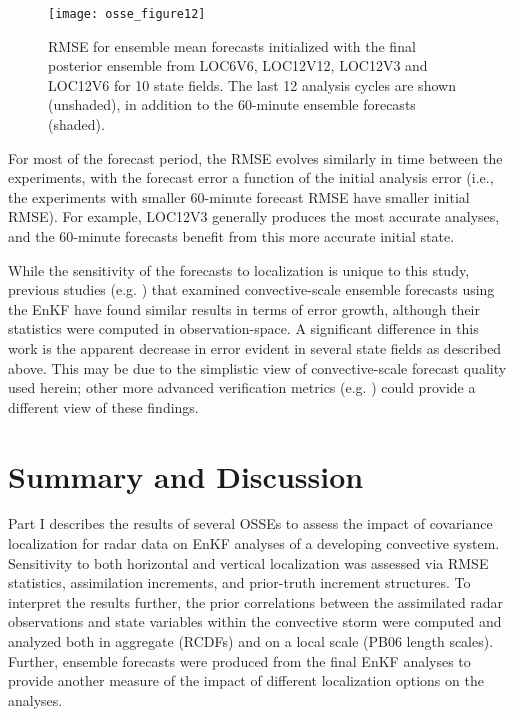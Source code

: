 \begin{figure}
\centering
\texttt{[image: osse\_figure12]}
\caption{RMSE for ensemble mean forecasts initialized with the final posterior ensemble from LOC6V6, LOC12V12, LOC12V3 and LOC12V6 for 10 state fields. The last 12 analysis cycles are shown (unshaded), in addition to the 60-minute ensemble forecasts (shaded).}
\label{osse_fig12}
\end{figure}

For most of the forecast period, the RMSE evolves similarly in time between the experiments, with the forecast error a function of the initial analysis error (i.e., the experiments with smaller 60-minute forecast RMSE have smaller initial RMSE). For example, LOC12V3 generally produces the most accurate analyses, and the 60-minute forecasts benefit from this more accurate initial state.

While the sensitivity of the forecasts to localization is unique to this study, previous studies (e.g. \citealt{aksoyetal10,dawsonetal12}) that examined convective-scale ensemble forecasts using the EnKF have found similar results in terms of error growth, although their statistics were computed in observation-space. A significant difference in this work is the apparent decrease in error evident in several state fields as described above. This may be due to the simplistic view of convective-scale forecast quality used herein; other more advanced verification metrics (e.g. \citealt{schwartzetal10}) could provide a different view of these findings.

\section{Summary and Discussion}
Part I describes the results of several OSSEs to assess the impact of covariance localization for radar data on EnKF analyses of a developing convective system. Sensitivity to both horizontal and vertical localization was assessed via RMSE statistics, assimilation increments, and prior-truth increment structures. To interpret the results further, the prior correlations between the assimilated radar observations and state variables within the convective storm were computed and analyzed both in aggregate (RCDFs) and on a local scale (PB06 length scales). Further, ensemble forecasts were produced from the final EnKF analyses to provide another measure of the impact of different localization options on the analyses.


